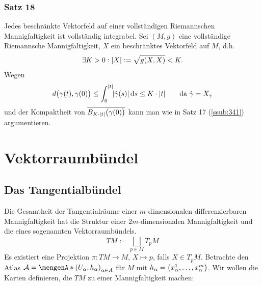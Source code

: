 \subsubsection{Satz 18} %
\label{ssub:342}
Jedes beschränkte Vektorfeld auf einer vollständigen Riemannschen Mannigfaltigkeit ist vollständig integrabel.
Sei $(M,g)$ eine vollständige Riemannsche Mannigfaltigkeit, $X$ ein beschränktes Vektorfeld auf $M$, d.h. 
\[
	\exists K > 0 : \abs*{X} := \sqrt{g(X,X)} < K.   
\]
Wegen
\begin{align*}
	d \enbrace[\big]{\gamma(t), \gamma(0)} \le \int_{0} ^{\abs*{t}} \!  \abs*{\dot{\gamma}(s)}  \, \mathrm{d}s \le K \cdot \abs*{t} \tag*{da $\dot{\gamma} = X_\gamma$}
\end{align*}
und der Kompaktheit von $\overline{B_{K \cdot \abs*{t}} \enbrace[\big]{\gamma(0)} } $ kann man wie in Satz 17 (\ref{ssub:341}) argumentieren. \bewende
\newpage

\section{Vektorraumbündel} %
\label{sec:4}

\subsection{Das Tangentialbündel} %
\label{sub:41}
Die Gesamtheit der Tangentialräume einer $m$-dimensionalen differenzierbaren Mannigfaltigkeit hat die Struktur einer $2m$-dimensionalen Mannigfaltigkeit und die eines
sogenannten Vektorraumbündels.
\[
	TM := \bigsqcup_{p \in M} T_pM
\]
Es existiert eine Projektion $\pi : T M  \to M $, $X \mapsto p$, falls $X \in T_pM$. Betrachte den Atlas $\mathcal{A} = \set{(U_\alpha, h_\alpha)}_{\alpha \in A} $ für $M$ mit 
$h_\alpha = \enbrace*{x^1_\alpha, \ldots , x^m_\alpha}$. Wir wollen die Karten definieren, die $T M$ zu einer Mannigfaltigkeit machen:

